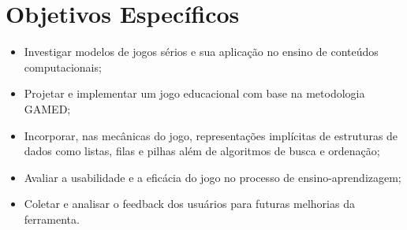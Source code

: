 \section{Objetivos Específicos}

\begin{itemize}
  \item Investigar modelos de jogos sérios e sua aplicação no ensino de conteúdos computacionais;
  \item Projetar e implementar um jogo educacional com base na metodologia GAMED;
  \item Incorporar, nas mecânicas do jogo, representações implícitas de estruturas de dados como listas, filas e pilhas além de algoritmos de busca e ordenação;
  \item Avaliar a usabilidade e a eficácia do jogo no processo de ensino-aprendizagem;
  \item Coletar e analisar o feedback dos usuários para futuras melhorias da ferramenta.
\end{itemize}
